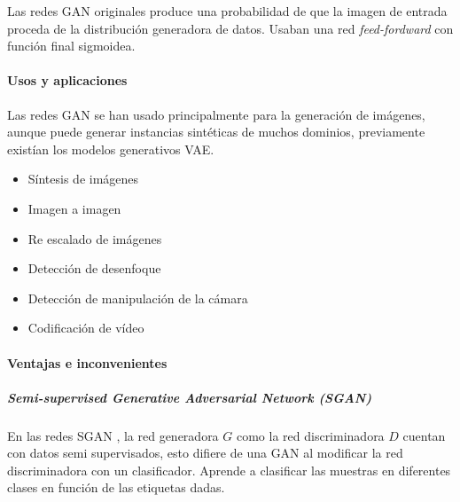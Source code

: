 Las redes \gls{GAN} originales produce una probabilidad de que la imagen de entrada proceda de la distribución generadora de datos. Usaban una red \textit{feed-fordward} con función final sigmoidea.




\paragraph*{Usos y aplicaciones}

Las redes \gls{GAN} se han usado principalmente para la generación de imágenes, aunque puede generar instancias sintéticas de muchos dominios, previamente existían los modelos generativos \gls{VAE}.



\begin{itemize}
    \item Síntesis de imágenes
    \item Imagen a imagen
    \item Re escalado de imágenes
    \item Detección de desenfoque
    \item Detección de manipulación de la cámara
    \item Codificación de vídeo
\end{itemize}
\paragraph*{Ventajas e inconvenientes}







\subparagraph*{Semi-supervised Generative Adversarial Network (SGAN)}
En las redes \gls{SGAN} \cite{SGAN-odena2016semisupervised}, la red generadora $G$ como la red discriminadora $D$ cuentan con datos semi supervisados, esto difiere de una \gls{GAN} al modificar la red discriminadora con un clasificador. Aprende a clasificar las muestras en diferentes clases en función de las etiquetas dadas.

